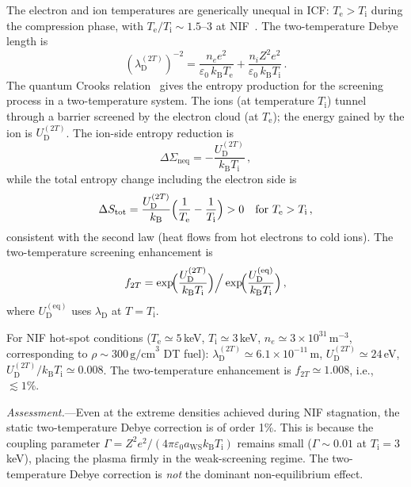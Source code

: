 \documentclass[prc,twocolumn,superscriptaddress,longbibliography,floatfix]{revtex4-2}
\newcommand{\kB}{k_{\mathrm{B}}}
\newcommand{\Sneq}{\Sigma_{\mathrm{neq}}}
\newcommand{\lD}{\lambda_{\mathrm{D}}}
\newcommand{\UD}{U_{\mathrm{D}}}
\newcommand{\Te}{T_{\mathrm{e}}}
\newcommand{\Ti}{T_{\mathrm{i}}}
\begin{document}
The electron and ion temperatures are generically unequal in ICF:
$\Te > \Ti$ during the compression phase, with
$\Te/\Ti \sim 1.5$--$3$ at NIF~\cite{Lindl2004,Hurricane2024}.
The two-temperature Debye length is~\cite{Ichimaru1993}
\begin{equation}
(\lD^{(2T)})^{-2} = \frac{n_{e}e^{2}}{\varepsilon_{0}\,\kB\Te}
+ \frac{n_{i}Z^{2}e^{2}}{\varepsilon_{0}\,\kB\Ti}\,.
\label{eq:lambda_2T}
\end{equation}
The quantum Crooks relation~\cite{Crooks1999,JRSWW2018} gives the
entropy production for the screening process in a two-temperature
system.  The ions (at temperature $\Ti$) tunnel through a barrier
screened by the electron cloud (at $\Te$); the energy gained by the
ion is $\UD^{(2T)}$.  The ion-side entropy reduction is
\begin{equation}
\Delta\Sneq = -\frac{\UD^{(2T)}}{\kB\Ti}\,,
\label{eq:sigma_neq}
\end{equation}
while the total entropy change including the electron
side is
\begin{equation}
\Delta S_{\mathrm{tot}} = \frac{\UD^{(2T)}}{\kB}
\Bigl(\frac{1}{\Te}-\frac{1}{\Ti}\Bigr) > 0
\quad\text{for }\Te > \Ti\,,
\label{eq:entropy_total}
\end{equation}
consistent with the second law (heat flows from hot electrons to
cold ions).  The two-temperature screening enhancement is
\begin{equation}
f_{2T} = \exp\!\Bigl(\frac{\UD^{(2T)}}{\kB\Ti}\Bigr)
\Big/ \exp\!\Bigl(\frac{\UD^{(\mathrm{eq})}}{\kB\Ti}\Bigr)\,,
\label{eq:f_2T}
\end{equation}
where $\UD^{(\mathrm{eq})}$ uses $\lD$ at $T = \Ti$.

For NIF hot-spot conditions ($\Te \simeq 5\,$keV, $\Ti \simeq 3\,$keV,
$n_{e} \simeq 3\times 10^{31}\,\mathrm{m}^{-3}$, corresponding to
$\rho \sim 300\,\mathrm{g/cm}^{3}$ DT fuel):
$\lD^{(2T)}\simeq 6.1\times 10^{-11}\,$m,
$\UD^{(2T)}\simeq 24\,$eV, $\UD^{(2T)}/\kB\Ti \simeq 0.008$.
The two-temperature enhancement is $f_{2T} \simeq 1.008$, i.e.,
$\lesssim 1\%$.

\textit{Assessment.}---Even at the extreme densities achieved during NIF
stagnation, the static two-temperature Debye correction is of order 1\%.
This is because the coupling parameter
$\Gamma = Z^{2}e^{2}/(4\pi\varepsilon_{0}a_{\mathrm{WS}}\kB\Ti)$
remains small ($\Gamma \sim 0.01$ at $\Ti = 3\,$keV), placing the
plasma firmly in the weak-screening regime.  The two-temperature
Debye correction is \emph{not} the dominant non-equilibrium effect.
\end{document}
